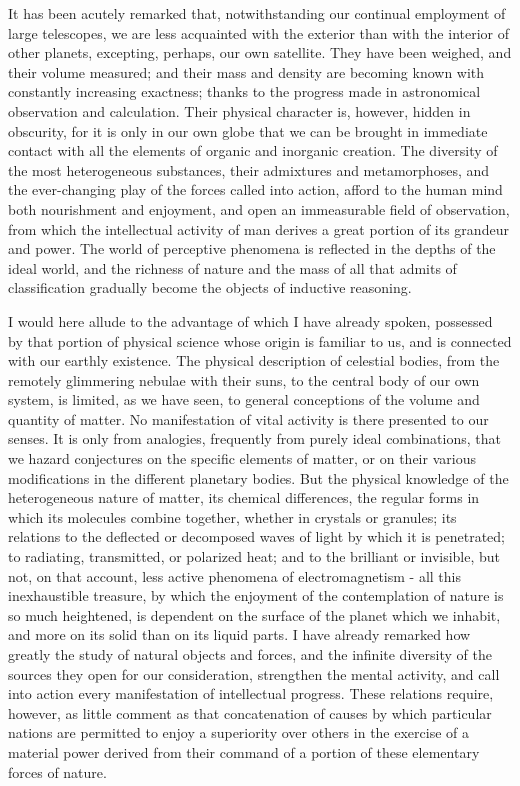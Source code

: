 It has been acutely remarked that, notwithstanding our continual employment of large telescopes, we are less acquainted with the exterior than with the interior of other planets, excepting, perhaps, our own satellite. They have been weighed, and their volume measured; and their mass and density are becoming known with constantly increasing exactness; thanks to the progress made in astronomical observation and calculation. Their physical character is, however, hidden in obscurity, for it is only in our own globe that we can be brought in immediate contact with all the elements of organic and inorganic creation. The diversity of the most heterogeneous substances, their admixtures and metamorphoses, and the ever-changing play of the forces called into action, afford to the human mind both nourishment and enjoyment, and open an immeasurable field of observation, from which the intellectual activity of man derives a great portion of its grandeur and power. The world of perceptive phenomena is reflected in the depths of the ideal world, and the richness of nature and the mass of all that admits of classification gradually become the objects of inductive reasoning.

I would here allude to the advantage of which I have already spoken, possessed by that portion of physical science whose origin is familiar to us, and is connected with our earthly existence. The physical description of celestial bodies, from the remotely glimmering nebulae with their suns, to the central body of our own system, is limited, as we have seen, to general conceptions of the volume and quantity of matter. No manifestation of vital activity is there presented to our senses. It is only from analogies, frequently from purely ideal combinations, that we hazard conjectures on the specific elements of matter, or on their various modifications in the different planetary bodies. But the physical knowledge of the heterogeneous nature of matter, its chemical differences, the regular forms in which its molecules combine together, whether in crystals or granules; its relations to the deflected or decomposed waves of light by which it is penetrated; to radiating, transmitted, or polarized heat; and to the brilliant or invisible, but not, on that account, less active phenomena of electromagnetism - all this inexhaustible treasure, by which the enjoyment of the contemplation of nature is so much heightened, is dependent on the surface of the planet which we inhabit, and more on its solid than on its liquid parts. I have already remarked how greatly the study of natural objects and forces, and the infinite diversity of the sources they open for our consideration, strengthen the mental activity, and call into action every manifestation of intellectual progress. These relations require, however, as little comment as that concatenation of causes by which particular nations are permitted to enjoy a superiority over others in the exercise of a material power derived from their command of a portion of these elementary forces of nature.

